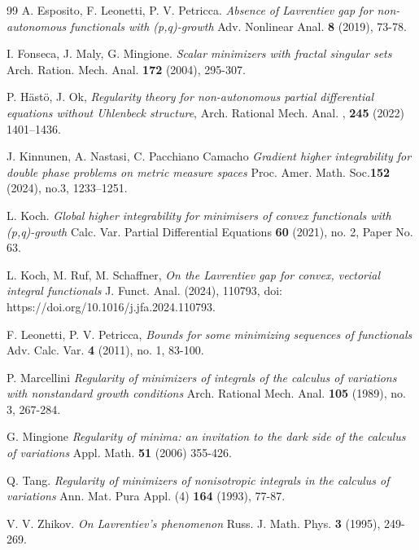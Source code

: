 \documentclass[a4paper,10pt]{article}
\theoremstyle{plain}
\theoremstyle{definition}
\numberwithin{equation}{section} \makeatletter
\begin{document}
\begin{thebibliography}{99}
A. Esposito,  F. Leonetti,  P. V. Petricca. {\em Absence of Lavrentiev gap for non-autonomous functionals with (p,q)-growth} {Adv. Nonlinear Anal.} {\bf 8} (2019), 73-78.

 
I. Fonseca, J. Maly, G. Mingione. {\em Scalar minimizers with fractal singular sets} {Arch. Ration. Mech. Anal.} {\bf 172} (2004),
295-307.


 P. H\"ast\"o, J. Ok, {\em Regularity theory for non-autonomous partial differential equations without Uhlenbeck structure}, Arch. Rational Mech. Anal. , {\bf 245} (2022) 1401–1436. 

J. Kinnunen, A. Nastasi, C. Pacchiano Camacho
{\em Gradient higher integrability for double phase problems on metric measure spaces} 
Proc. Amer. Math. Soc.{\bf 152} (2024), no.3, 1233–1251.

L. Koch. {\em Global higher integrability for minimisers of convex functionals with (p,q)-growth} 
{Calc. Var. Partial Differential Equations} {\bf 60} (2021), no. 2, Paper No. 63.

L. Koch, M. Ruf, M. Schaffner, {\em On the Lavrentiev gap for convex, vectorial integral functionals} J. Funct. Anal. (2024),
110793, doi: https://doi.org/10.1016/j.jfa.2024.110793.

F. Leonetti, P. V. Petricca, 
{\em Bounds for some minimizing sequences of functionals} 
Adv. Calc. Var. {\bf 4} (2011), no. 1, 83-100.

P. Marcellini
{\em Regularity of minimizers of integrals of the calculus of variations with nonstandard growth conditions} {Arch. Rational Mech. Anal.} {\bf 105} (1989), no. 3, 267-284.


G. Mingione
{\em Regularity of minima: an
invitation to the dark side of the calculus of variations} 
{Appl. Math.} {\bf 51}{ (2006) 355-426}.



Q. Tang. {\em Regularity of minimizers of nonisotropic integrals in the calculus of variations} {Ann. Mat. Pura Appl.} (4) {\bf 164}
(1993), 77-87.

 V. V. Zhikov. {\em On Lavrentiev's phenomenon} {Russ. J. Math. Phys.} {\bf 3} (1995), 249-269.

\end{thebibliography}
\end{document}
